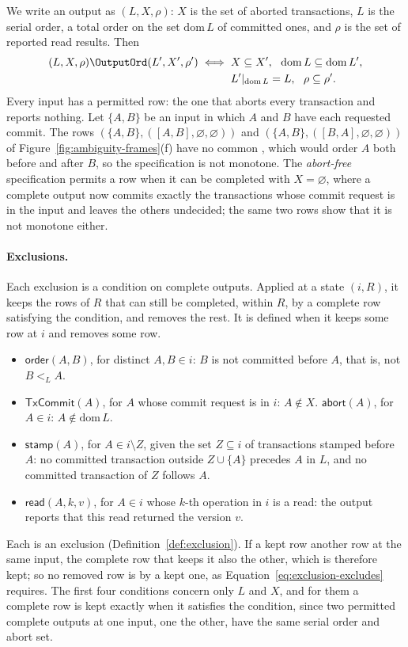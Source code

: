 We write an output as $(L,X,\rho)$: $X$ is the set of aborted transactions, $L$
is the serial order, a total order on the set $\mathrm{dom}\,L$ of committed
ones, and $\rho$ is the set of reported read results.  Then
\[
  \begin{aligned}
  (L,X,\rho)\OutputOrd(L',X',\rho')
  \iff{}& X\subseteq X',\ \ \mathrm{dom}\,L\subseteq\mathrm{dom}\,L',\\
         & L'|_{\mathrm{dom}\,L}=L,\ \ \rho\subseteq\rho'.
  \end{aligned}
\]
Every input has a permitted row: the one that aborts every transaction and
reports nothing.  Let $\{A,B\}$ be an input in which $A$ and $B$ have each
requested commit.  The rows $(\{A,B\},([A,B],\varnothing,\varnothing))$ and
$(\{A,B\},([B,A],\varnothing,\varnothing))$ of
Figure~\ref{fig:ambiguity-frames}(f) have no common \outnoun, which would order
$A$ both before and after $B$, so the specification is not monotone.  The
\emph{abort-free} specification permits a row when it can be completed with
$X=\varnothing$, where a complete output now commits exactly the transactions
whose commit request is in the input and leaves the others undecided; the same
two rows show that it is not monotone either.

\paragraph{Exclusions.}
Each exclusion is a condition on complete outputs.  Applied at a state
$(i,R)$, it keeps the rows of $R$ that can still be completed, within $R$, by a
complete row satisfying the condition, and removes the rest.  It is defined
when it keeps some row at $i$ and removes some row.
\begin{itemize}
  \item $\mathsf{order}(A,B)$, for distinct $A,B\in i$: $B$ is not committed
        before $A$, that is, not $B<_L A$.
  \item $\mathsf{TxCommit}(A)$, for $A$ whose commit request is in $i$:
        $A\notin X$.\quad
        $\mathsf{abort}(A)$, for $A\in i$: $A\notin\mathrm{dom}\,L$.
  \item $\mathsf{stamp}(A)$, for $A\in i\setminus Z$, given the set $Z\subseteq
        i$ of transactions stamped before $A$: no committed transaction outside
        $Z\cup\{A\}$ precedes $A$ in $L$, and no committed transaction of $Z$
        follows $A$.
  \item $\mathsf{read}(A,k,v)$, for $A\in i$ whose $k$-th operation in $i$ is a
        read: the output reports that this read returned the version $v$.
\end{itemize}
Each is an exclusion (Definition~\ref{def:exclusion}).  If a kept row \outrel
another row at the same input, the complete row that keeps it also
\outrel the other, which is therefore kept; so no removed row is \outrelpast by
a kept one, as Equation~\ref{eq:exclusion-excludes} requires.  The first four
conditions concern only $L$ and $X$, and for them a complete row is kept
exactly when it satisfies the condition, since two permitted complete outputs
at one input, one \outrelpart the other, have the same serial order and abort
set.


